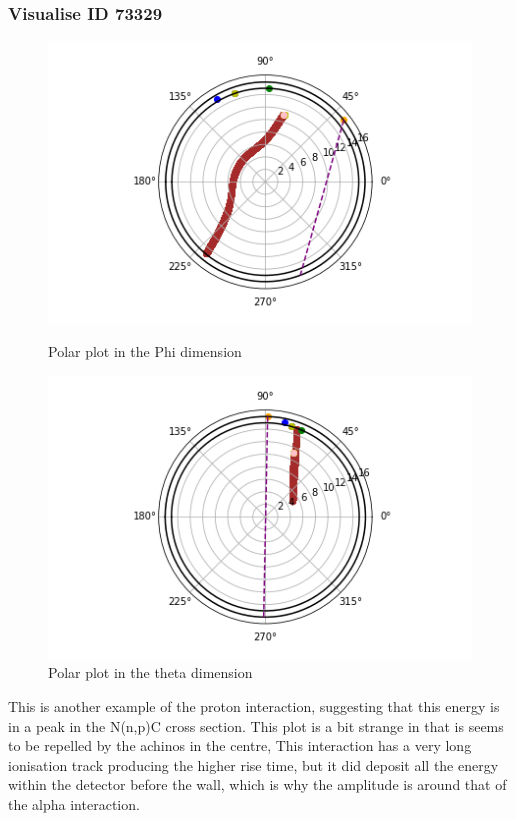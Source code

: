 \documentclass[a4paper]{article}
\begin{document}
\subsubsection{Visualise ID 73329}
\begin{figure}[H]
    \centering
    \begin{minipage}{.5\textwidth}
        \centering
        \includegraphics[width=1\linewidth]{Fast/73329_phi.png}
        \caption{Polar plot in the Phi dimension}
        \label{fig:prob1_6_2}
    \end{minipage}%
    \begin{minipage}{0.5\textwidth}
        \centering
        \includegraphics[width=1\linewidth]{Fast/73329_theta.png}
        \caption{Polar plot in the theta dimension}
        \label{fig:prob1_6_1}
    \end{minipage}
\end{figure}
\noindent This is another example of the proton interaction, suggesting that this energy is in a peak in the N(n,p)C cross section. This plot is a bit strange in that is seems to be repelled by the achinos in the centre, This interaction has a very long ionisation track producing the higher rise time, but it did deposit all the energy within the detector before the wall, which is why the amplitude is around that of the alpha interaction.
\end{document}
